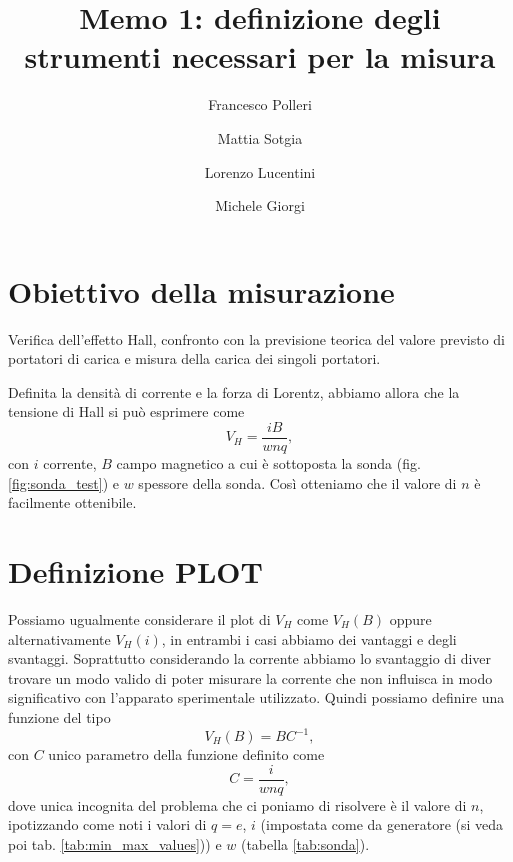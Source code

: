 \documentclass[fleqn,varvw]{memo}
\begin{document}
\title{Memo 1: definizione degli strumenti necessari per la misura}

\author{Francesco Polleri}
\author{Mattia Sotgia}


\author{Lorenzo Lucentini}
\author{Michele Giorgi}

\revised{\today}

\begin{abstract}

\end{abstract}
\maketitle

\section{Obiettivo della misurazione}

Verifica dell'effetto Hall, confronto con la previsione teorica del valore previsto di portatori di carica e misura della carica dei singoli portatori.

Definita la densità di corrente e la forza di Lorentz, abbiamo allora che la tensione di Hall si può esprimere come \begin{equation}
    V_H = \frac{iB}{wnq},
\end{equation} con $i$ corrente, $B$ campo magnetico a cui è sottoposta la sonda (fig. \ref{fig:sonda_test}) e $w$ spessore della sonda. Così otteniamo che il valore di $n$ è facilmente ottenibile. 



\section{Definizione PLOT}

Possiamo ugualmente considerare il plot di $V_H$ come $V_H(B)$ oppure alternativamente $V_H(i)$, in entrambi i casi abbiamo dei vantaggi e degli svantaggi. Soprattutto considerando la corrente abbiamo lo svantaggio di diver trovare un modo valido di poter misurare la corrente che non influisca in modo significativo con l'apparato sperimentale utilizzato. 
Quindi possiamo definire una funzione del tipo \begin{equation}
    V_H(B) = BC^{-1},
\end{equation} con $C$ unico parametro della funzione definito come \begin{equation}
    C=\frac{i}{wnq},
\end{equation} dove unica incognita del problema che ci poniamo di risolvere è il valore di $n$, ipotizzando come noti i valori di $q=e$, $i$ (impostata come da generatore (si veda poi tab. \ref{tab:min_max_values})) e $w$ (tabella \ref{tab:sonda}).
\end{document}
